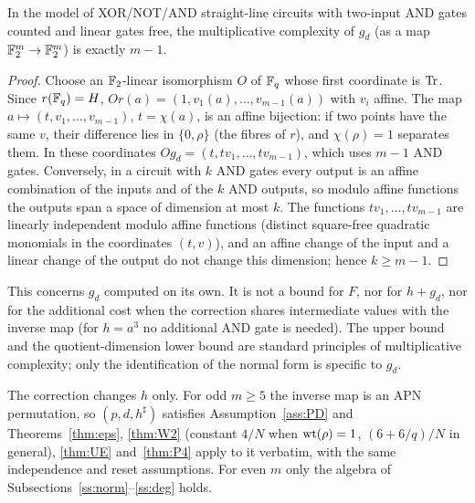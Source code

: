 \begin{proposition}\label{prop:mc}
In the model of XOR/NOT/AND straight-line circuits with two-input AND gates counted and linear gates free,
the multiplicative complexity of $g_d$ (as a map $\mathbb{F}_2^m\to\mathbb{F}_2^m$) is exactly $m-1$.
\end{proposition}
\begin{proof}
Choose an $\mathbb{F}_2$-linear isomorphism $O$ of $\mathbb{F}_q$ whose first coordinate is $\mathrm{Tr}$. Since $r(\mathbb{F}_q)=H$, $Or(a)=(1,v_1(a),\dots,v_{m-1}(a))$
with $v_i$ affine. The map $a\mapsto(t,v_1,\dots,v_{m-1})$, $t=\chi(a)$, is an affine bijection: if two points have the same $v$, their
difference lies in $\{0,\rho\}$ (the fibres of $r$), and $\chi(\rho)=1$ separates them. In these coordinates
$Og_d=(t,tv_1,\dots,tv_{m-1})$, which uses $m-1$ AND gates. Conversely, in a circuit with $k$ AND gates every output is an affine
combination of the inputs and of the $k$ AND outputs, so modulo affine functions the outputs span a space of dimension at most $k$.
The functions $tv_1,\dots,tv_{m-1}$ are linearly independent modulo affine functions (distinct square-free quadratic monomials in
the coordinates $(t,v)$), and an affine change of the input and a linear change of the output do not change this dimension; hence
$k\ge m-1$.
\end{proof}
This concerns $g_d$ computed on its own. It is not a bound for $F$, nor for $h+g_d$, nor for the additional cost when the
correction shares intermediate values with the inverse map (for $h=a^3$ no additional AND gate is needed). The upper bound and
the quotient-dimension lower bound are standard principles of multiplicative complexity; only the identification of the
normal form is specific to $g_d$.

\begin{remark}\label{rem:same}
The correction changes $h$ only. For odd $m\ge5$ the inverse map is an APN permutation, so $(p,d,h^\sharp)$
satisfies Assumption~\ref{ass:PD} and Theorems~\ref{thm:eps}, \ref{thm:W2} (constant $4/N$ when $\mathrm{wt}(\rho)=1$,
$(6+6/q)/N$ in general), \ref{thm:UE} and~\ref{thm:P4} apply to it verbatim, with the same independence and
reset assumptions. For even $m$ only the algebra of Subsections~\ref{ss:norm}--\ref{ss:deg} holds.
\end{remark}

